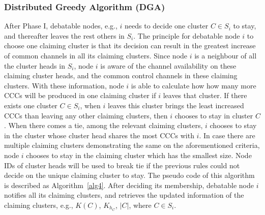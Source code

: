\documentclass[10pt,journal,compsoc]{IEEEtran}
\theoremstyle{mytheoremstyle}
\theoremstyle{mytheoremstyle}
\theoremstyle{mytheoremstyle}
\newcommand{\eg}{e.g., }
\newcommand{\ie}{i.e., }
\begin{document}
\subsubsection{Distributed Greedy Algorithm (DGA)}
After Phase I, debatable nodes, \eg $i$ needs to decide one cluster $C\in S_i$ to stay, and thereafter leaves the rest others in $S_i$.
The principle for debatable node $i$ to choose one claiming cluster is that its decision can result in the greatest increase of common channels in all its claiming clusters.
Since node $i$ is a neighbour of all the cluster heads in $S_i$, node $i$ is aware of the channel availability on these claiming cluster heads, and the common control channels in these claiming clusters.
With these information, node $i$ is able to calculate how how many more CCCs will be produced in one claiming cluster if $i$ leaves that cluster.
If there exists one cluster $C\in S_i$, when $i$ leaves this cluster brings the least increased CCCs than leaving any other claiming clusters, then $i$ chooses to stay in cluster $C$.
When there comes a tie, among the relevant claiming clusters, $i$ chooses to stay in the cluster whose cluster head shares the most CCCs with $i$.
In case there are multiple claiming clusters demonstrating the same on the aforementioned criteria, node $i$ chooses to stay in the claiming cluster which has the smallest size.
Node IDs of cluster heads will be used to break tie if the previous rules could not decide on the unique claiming cluster to stay.
The pseudo code of this algorithm is described as Algorithm~\ref{alg4}.
After deciding its membership, debatable node $i$ notifies all its claiming clusters, and retrieves the updated information of the claiming clusters, \eg $K(C)$, $K_{h_C}$, $|C|$, where $C\in S_i$.
\end{document}
